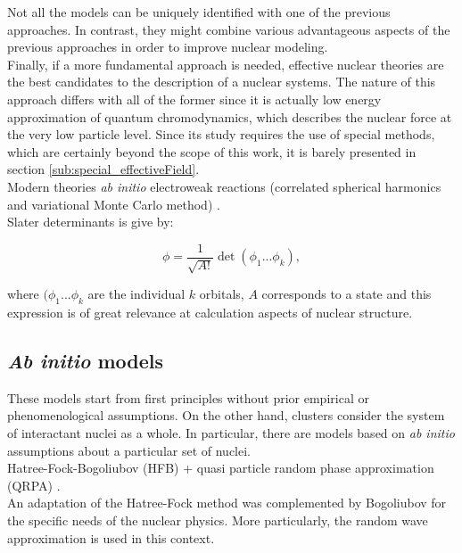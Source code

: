 \documentclass[openany]{book}
\begin{document}
Not all the models can be uniquely identified with one of the previous approaches. In contrast, they might combine various advantageous aspects of the previous approaches in order to improve nuclear modeling.\\

Finally, if a more fundamental approach is needed, effective nuclear theories are the best candidates to the description of a nuclear systems. The nature of this approach differs with all of the former since it is actually low energy approximation of quantum chromodynamics, which describes the nuclear force at the very low particle level.  Since its study requires the use of special methods, which are certainly beyond the scope of this work, it is barely presented in section \ref{sub:special_effectiveField}. \\

Modern theories \textit{ab initio} electroweak reactions  (correlated spherical harmonics and variational Monte Carlo method) \cite{marcucci_nollett_schiavilla_wiringa_2006}. \\

Slater determinants is give by: 

\begin{equation} \label{eq:micro_slatter}
	\phi = \frac{1}{\sqrt{A!}} \det{(\phi_1 ... \phi_k)},
\end{equation}

where $(\phi_1 ... \phi_k$ are the individual $k$ orbitals, $A$ corresponds to a state and this expression is of great relevance at calculation aspects of nuclear structure.

\subsection{\textit{Ab initio} models} \label{sub:microscopical_abinitio}

These models start from first principles without prior empirical or phenomenological assumptions. 
On the other hand, clusters consider the system of interactant nuclei as a whole. In particular, there are models based on \textit{ab initio} assumptions about a particular set of nuclei.  \\
 
Hatree-Fock-Bogoliubov (HFB) + quasi particle random phase approximation (QRPA) \cite{chimanski_in_escher_peru_younes_2022}. \\

An adaptation of the Hatree-Fock method was complemented by Bogoliubov for the specific needs of the nuclear physics. More particularly, the random wave approximation is used in this context.  \\
\end{document}
